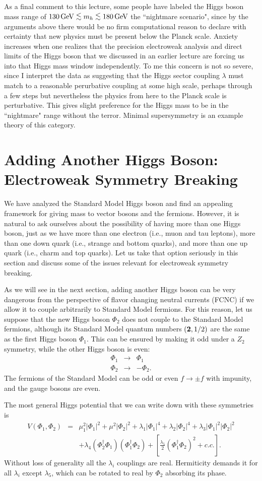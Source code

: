 \documentclass[12pt]{article}
\def\bea{\begin{eqnarray}}
\def\eea{\end{eqnarray}}
\def\xsection#1{\section{#1}}
\def\gev{\, {\rm GeV}}
\newcommand{\lsim}{\lower.7ex\hbox{$\;\stackrel{\textstyle<}{\sim}\;$}}
\begin{document}
As a final comment to this lecture, some people have labeled the Higgs boson mass range of $130\gev \lsim m_h\lsim 180\gev$ the ``nightmare scenario", since by the arguments above there would be no firm computational reason to declare with certainty that new physics must be present below the Planck scale. Anxiety increases when one realizes that the precision electroweak analysis and direct limits of the Higgs boson that we discussed in an earlier lecture are forcing us into that Higgs mass window independently.   To me this concern is not so severe, since I interpret the data as suggesting that the Higgs sector coupling $\lambda$ must match to a reasonable perurbative coupling at some high scale, perhaps through a few steps but nevertheless the physics from here to the Planck scale is perturbative. This gives slight preference for the Higgs mass to be in the ``nightmare" range without the terror. Minimal supersymmetry is an example theory of this category.


\xsection{Adding Another Higgs Boson: Electroweak Symmetry Breaking\label{add higgs}}

We have analyzed the Standard Model Higgs boson and find an appealing framework for giving mass to vector bosons and the fermions. However, it is natural to ask ourselves about the possibility of having more than one Higgs boson, just as we have more than one electron (i.e., muon and tau leptons), more than one down quark  (i.e., strange and bottom quarks), and more than one up quark (i.e., charm and top quarks). 
Let us take that option seriously in this section and discuss some of the issues relevant for electroweak symmetry breaking.

As we will see in the next section, adding another Higgs boson can be very dangerous from the perspective of flavor changing neutral currents (FCNC) if we allow it to couple arbitrarily to Standard Model fermions. For this reason, let us suppose that the new Higgs boson $\Phi_2$ does not couple to the Standard Model fermions, although its Standard Model quantum numbers $({\bf 2},1/2)$ are the same as the first Higgs boson $\Phi_1$. This can be ensured by making it odd under a $Z_2$ symmetry, while the other Higgs boson is even:
\bea
\Phi_1 & \to & \Phi_1 \\
\Phi_2 & \to & -\Phi_2.
\eea
The fermions of the Standard Model can be odd or even $f\to \pm f$ with impunity, and the gauge bosons are even. 

The most general Higgs potential that we can write down with these symmetries is
\bea
V(\Phi_1,\Phi_2) & = & \mu^2_1|\Phi_1|^2+\mu^2|\Phi_2|^2+\lambda_1|\Phi_1|^4+\lambda_2|\Phi_2|^4+\lambda_3|\Phi_1|^2|\Phi_2|^2 \nonumber \\
& & +\lambda_4 (\Phi_2^\dagger\Phi_1)(\Phi^\dagger_1\Phi_2)+
\left[ \frac{\lambda_5}{2}(\Phi_1^\dagger\Phi_2)^2+c.c.\right].
\label{eq:type I potential}
\eea
Without loss of generality all the $\lambda_i$ couplings are real. Hermiticity demands it for all $\lambda_i$ except $\lambda_5$, which can be rotated to real by $\Phi_2$ absorbing its phase. 
\end{document}
